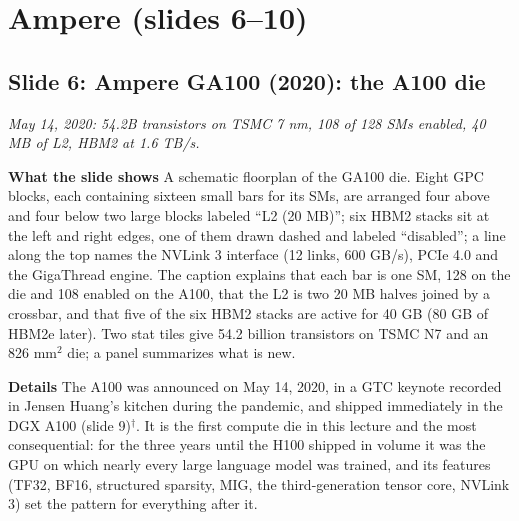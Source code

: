 \documentclass[11pt,letterpaper]{article}
\newcommand{\setstage}[1]{\colorlet{stagec}{#1}}
\newcommand{\slide}[3]{%
  \subsection[Slide #1: #2]{Slide #1: #2}%
  {\color{muted}\itshape #3\par}\medskip}
\newcommand{\para}[1]{\medskip\noindent\textbf{#1}\quad}
\begin{document}
\setstage{emb}
\section{Ampere (slides 6--10)}

\slide{6}{Ampere GA100 (2020): the A100 die}{May 14, 2020: 54.2B transistors on TSMC 7 nm, 108 of 128 SMs enabled, 40 MB of L2, HBM2 at 1.6 TB/s.}

\para{What the slide shows} A schematic floorplan of the GA100 die. Eight GPC blocks, each containing sixteen small bars for its SMs, are arranged four above and four below two large blocks labeled ``L2 (20 MB)''; six HBM2 stacks sit at the left and right edges, one of them drawn dashed and labeled ``disabled''; a line along the top names the NVLink 3 interface (12 links, 600 GB/s), PCIe 4.0 and the GigaThread engine. The caption explains that each bar is one SM, 128 on the die and 108 enabled on the A100, that the L2 is two 20 MB halves joined by a crossbar, and that five of the six HBM2 stacks are active for 40 GB (80 GB of HBM2e later). Two stat tiles give 54.2 billion transistors on TSMC N7 and an 826 mm$^2$ die; a panel summarizes what is new.

\para{Details} The A100 was announced on May 14, 2020, in a GTC keynote recorded in Jensen Huang's kitchen during the pandemic, and shipped immediately in the DGX A100 (slide 9)$^\dagger$. It is the first compute die in this lecture and the most consequential: for the three years until the H100 shipped in volume it was the GPU on which nearly every large language model was trained, and its features (TF32, BF16, structured sparsity, MIG, the third-generation tensor core, NVLink 3) set the pattern for everything after it.
\end{document}
